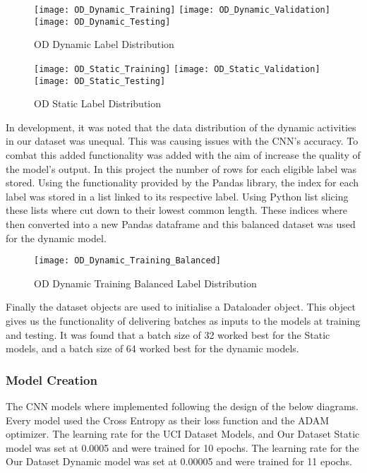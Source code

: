         \begin{figure}[htp]
        \centering
        \texttt{[image: OD\_Dynamic\_Training]}\hfill
        \texttt{[image: OD\_Dynamic\_Validation]}\hfill
        \texttt{[image: OD\_Dynamic\_Testing]}
        \caption{OD Dynamic Label Distribution}
        \label{fig:figureX}
        \end{figure}

        \begin{figure}[htp]
        \centering
        \texttt{[image: OD\_Static\_Training]}\hfill
        \texttt{[image: OD\_Static\_Validation]}\hfill
        \texttt{[image: OD\_Static\_Testing]}
        \caption{OD Static Label Distribution}
        \label{fig:figureX}
        \end{figure}

        In development, it was noted that the data distribution of the dynamic activities in our dataset was unequal.
        This was causing issues with the CNN's accuracy.
        To combat this added functionality was added with the aim of increase the quality of the model's output.
        In this project the number of rows for each eligible label was stored.
        Using the functionality provided by the Pandas library, the index for each label was stored in a list linked to its respective label.
        Using Python list slicing these lists where cut down to their lowest common length.
        These indices where then converted into a new Pandas dataframe and this balanced dataset was used for the dynamic model.

        \begin{figure}[htp]
        \centering
        \texttt{[image: OD\_Dynamic\_Training\_Balanced]}
        \caption{OD Dynamic Training Balanced Label Distribution}
        \label{fig:figureX}
        \end{figure}

        Finally the dataset objects are used to initialise a Dataloader object.
        This object gives us the functionality of delivering batches as inputs to the models at training and testing.
        It was found that a batch size of 32 worked best for the Static models, and a batch size of 64 worked best for the dynamic models.

    \subsubsection{Model Creation}
        The CNN models where implemented following the design of the below diagrams.
        Every model used the Cross Entropy as their loss function and the ADAM optimizer.
        The learning rate for the UCI Dataset Models, and Our Dataset Static model was set at 0.0005 and were trained for 10 epochs.
        The learning rate for the Our Dataset Dynamic model was set at 0.00005 and were trained for 11 epochs.